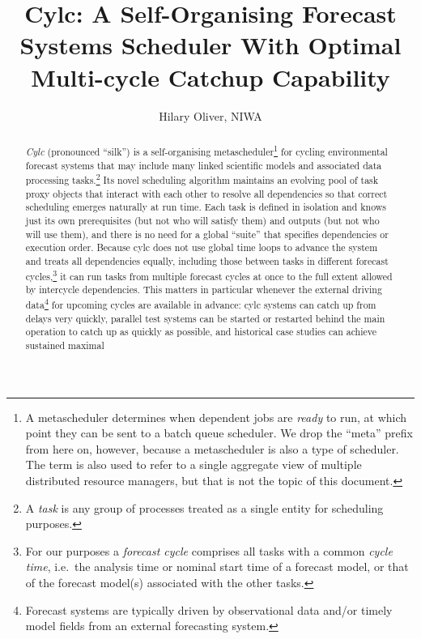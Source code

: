 \documentclass[11pt,a4paper]{article}
\title{Cylc: A Self-Organising Forecast Systems Scheduler With Optimal
Multi-cycle Catchup Capability}
\author{Hilary Oliver, NIWA}
\begin{document}
\maketitle

\pagebreak
\tableofcontents
\pagebreak

\begin{abstract}

    {\em Cylc} (pronounced ``silk'') is a self-organising
    metascheduler\footnote{A metascheduler determines when dependent
    jobs are {\em ready} to run, at which point they can be sent to a
    batch queue scheduler. We drop the ``meta'' prefix from here on,
    however, because a metascheduler is also a type of scheduler. The
    term is also used to refer to a single aggregate view of multiple
    distributed resource managers, but that is not the topic of this
    document.} for cycling environmental forecast systems that may include
    many linked scientific models and associated data processing
    tasks.\footnote{A {\em task} is any group of processes treated as a
    single entity for scheduling purposes.} Its novel scheduling
    algorithm maintains an evolving pool of task proxy objects that
    interact with each other to resolve all dependencies so that correct
    scheduling emerges naturally at run time.  Each task is defined in
    isolation and knows just its own prerequisites (but not who will
    satisfy them) and outputs (but not who will use them), and there is
    no need for a global ``suite'' that specifies dependencies or
    execution order. Because cylc does not use global time loops to
    advance the system and treats all dependencies equally, including
    those between tasks in different forecast cycles,\footnote{For our
    purposes a {\em forecast cycle} comprises all tasks with a common
    {\em cycle time}, i.e.\ the analysis time or nominal start time of a
    forecast model, or that of the forecast model(s) associated with the
    other tasks.} it can run tasks from multiple forecast cycles at once
    to the full extent allowed by intercycle dependencies. This matters
    in particular whenever the external driving data\footnote{Forecast
    systems are typically driven by observational data and/or timely
    model fields from an external forecasting system.} for upcoming
    cycles are available in advance: cylc systems can catch up from
    delays very quickly, parallel test systems can be started or
    restarted behind the main operation to catch up as quickly as
    possible, and historical case studies can achieve sustained maximal

\end{abstract}
\end{document}
